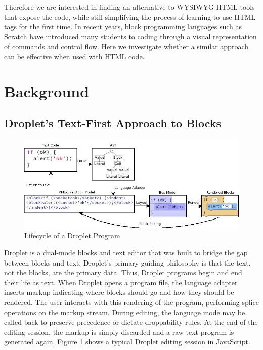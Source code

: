 \documentclass[conference]{IEEEtran}
\begin{document}
Therefore we are interested in finding an alternative to WYSIWYG HTML tools that expose the code, while still simplifying the process of learning to use HTML tags for the first time.  In recent years, block programming languages such as Scratch \cite{Scratch} have introduced many students to coding through a visual representation of commands and control flow.  Here we investigate whether a similar approach can be effective when used with HTML code.

\section{Background}

\subsection{Droplet's Text-First Approach to Blocks}

\begin{figure}
\centering
\includegraphics[width=5in]{image11.jpg}
\caption{Lifecycle of a Droplet Program}
\label{lifecycle}
\end{figure}

Droplet \cite{Droplet} is a dual-mode blocks and text editor that was built to bridge the gap between blocks and text. Droplet's primary guiding philosophy is that the text, not the blocks, are the primary data. Thus, Droplet programs begin and end their life as text. When Droplet opens a program file, the language adapter inserts markup indicating where blocks should go and how they should be rendered. The user interacts with this rendering of the program, performing splice operations on the markup stream. During editing, the language mode may be called back to preserve precedence or dictate droppability rules. At the end of the editing session, the markup is simply discarded and a raw text program is generated again. Figure \ref{lifecycle} shows a typical Droplet editing session in JavaScript.
\end{document}
